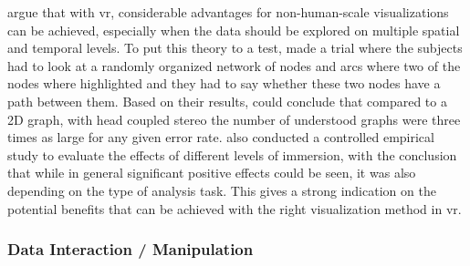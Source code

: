 \cite{VanDam2002} argue that with \gls{vr}, considerable advantages for non-human-scale visualizations can be achieved, especially when the data should be explored on multiple spatial and temporal levels. To put this theory to a test, \cite{Ware1994} made a trial where the subjects had to look at a randomly organized network of nodes and arcs where two of the nodes where highlighted and they had to say whether these two nodes have a path between them. Based on their results, \cite{Ware1994} could conclude that compared to a 2D graph, with head coupled stereo the number of understood graphs were three times as large for any given error rate. \cite{Laha2012} also conducted a controlled empirical study to evaluate the effects of different levels of immersion, with the conclusion that while in general significant positive effects could be seen, it was also depending on the type of analysis task. This gives a strong indication on the potential benefits that can be achieved with the right visualization method in \gls{vr}.



\subsubsection{Data Interaction / Manipulation}

\label{SubSectionVisualisationManipulation}

